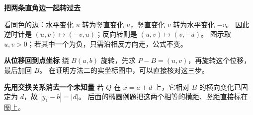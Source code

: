 \begin{explanationbox}
    \textbf{\textcolor{CExplanation}{把两条直角边一起转过去}}


    看同色的边：水平变化 $u$ 转为竖直变化 $u$，竖直变化 $v$ 转为水平变化 $-v$。
    因此逆时针是 $(u,v)\mapsto(-v,u)$；反向转则是 $(u,v)\mapsto(v,-u)$。
    图示取 $u,v>0$；若其中一个为负，只需沿相反方向走，公式不变。

    \medskip
    \textbf{\textcolor{CExplanation}{从位移回到点坐标}}
    绕 $B(a,b)$ 旋转，先求 $P-B=(u,v)$，再旋转这个位移，最后加回 $B$。
    在证明方法二的实坐标图中，可以直接核对这三步。

    \medskip
    \textbf{\textcolor{CExplanation}{先用交换关系消去一个未知量}}
    若 $Q$ 在 $x=a+d$ 上，它相对 $B$ 的横向变化已固定为 $d$，故 $|y_1-b|=|d|$。
    后面的椭圆例题把这两个相等的横距、竖距直接标在图上。
\end{explanationbox}
